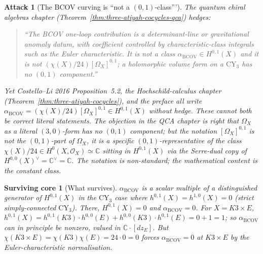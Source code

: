 \documentclass[11pt]{article}
\newtheorem{attack}[theorem]{Attack}
\newtheorem{surviving}[theorem]{Surviving core}
\providecommand{\CY}{\mathrm{CY}}
\providecommand{\BCOV}{\mathrm{BCOV}}
\providecommand{\Om}{\Omega}
\providecommand{\cO}{\mathcal{O}}
\providecommand{\CC}{\mathbb{C}}
\begin{document}
\begin{attack}[The BCOV curving is ``not a $(0,1)$-class''']
\label{atk:2}
The quantum chiral algebras chapter (Theorem~\ref{thm:three-atiyah-cocycles-qca})
hedges:
\begin{quote}
``The BCOV one-loop contribution is a determinant-line or gravitational
anomaly datum, with coefficient controlled by characteristic-class
integrals such as the Euler characteristic. It is not a class
$\alpha_\BCOV \in H^{0,1}(X)$ and it is not $(\chi(X)/24) [\Om_X]^{0,1}$;
a holomorphic volume form on a $\CY_3$ has no $(0,1)$ component.''
\end{quote}
Yet Costello--Li 2016 Proposition~5.2, the Hochschild-calculus chapter
(Theorem~\ref{thm:three-atiyah-cocycles}), and the preface all write
$\alpha_\BCOV = (\chi(X)/24)[\Om_X]^{0,1} \in H^{0,1}(X)$ without
hedge. These cannot both be correct literal statements. The objection in
the QCA chapter is right that $\Om_X$ as a literal $(3,0)$-form has no
$(0,1)$ component; but the notation $[\Om_X]^{0,1}$ is not the
$(0,1)$-part of $\Om_X$, it is a specific $(0,1)$-representative of the
class $\chi(X)/24 \in H^0(X, \cO_X) \simeq \CC$ sitting in $H^{0,1}(X)$
via the Serre-dual copy of $H^{0,0}(X)^\vee = \CC^\vee = \CC$. The
notation is non-standard; the mathematical content is the constant
class.
\end{attack}

\begin{surviving}[What survives]
\label{surv:2}
$\alpha_\BCOV$ is a scalar multiple of a distinguished generator of
$H^{0,1}(X)$ in the $\CY_3$ case where $h^{0,1}(X) = h^{1,0}(X) = 0$
(strict simply-connected $\CY_3$). There, $H^{0,1}(X) = 0$ and
$\alpha_\BCOV = 0$. For $X = K3 \times E$, $h^{0,1}(X) = h^{0,1}(K3)
\cdot h^{0,0}(E) + h^{0,0}(K3) \cdot h^{0,1}(E) = 0 + 1 = 1$; so
$\alpha_\BCOV$ can in principle be nonzero, valued in $\CC \cdot [dz_E]$.
But $\chi(K3 \times E) = \chi(K3) \chi(E) = 24 \cdot 0 = 0$ forces
$\alpha_\BCOV = 0$ at $K3 \times E$ by the Euler-characteristic
normalisation.
\end{surviving}
\end{document}
